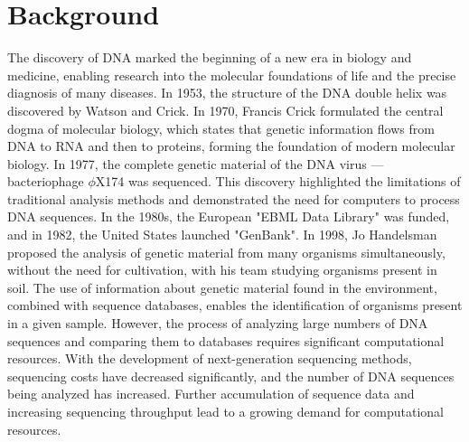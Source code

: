 \documentclass[pdflatex,sn-vancouver-num]{sn-jnl}%
\begin{document}


    \maketitle


    \section{Background}
        The discovery of DNA marked the beginning of a new era in biology and medicine, enabling research into the molecular foundations of life and the precise diagnosis of many diseases\cite{Louie:2000}. In 1953, the structure of the DNA double helix was discovered by Watson and Crick\cite{Watson:1953}. In 1970, Francis Crick formulated the central dogma of molecular biology\cite{Crick:1970}, which states that genetic information flows from DNA to RNA and then to proteins, forming the foundation of modern molecular biology. In 1977, the complete genetic material of the DNA virus — bacteriophage $\phi{}$X174 was sequenced\cite{Sanger:1977:2}. This discovery highlighted the limitations of traditional analysis methods and demonstrated the need for computers to process DNA sequences\cite{Staden:1979}. In the 1980s, the European "EBML Data Library" was funded\cite{Higgins:1992}, and in 1982, the United States launched "GenBank"\cite{Bilofsky:1986}. In 1998, Jo Handelsman proposed the analysis of genetic material from many organisms simultaneously, without the need for cultivation, with his team studying organisms present in soil\cite{Handelsman:1998}. The use of information about genetic material found in the environment, combined with sequence databases, enables the identification of organisms present in a given sample. However, the process of analyzing large numbers of DNA sequences and comparing them to databases requires significant computational resources. With the development of next-generation sequencing methods\cite{Reinartz:2002}, sequencing costs have decreased significantly, and the number of DNA sequences being analyzed has increased\cite{Muir:2016}. Further accumulation of sequence data and increasing sequencing throughput lead to a growing demand for computational resources.
\end{document}
